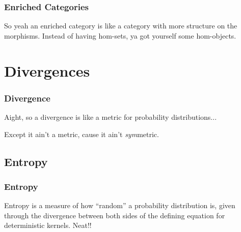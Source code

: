 \documentclass{beamer}
\begin{document}
\begin{frame}
	\frametitle{Enriched Categories}
	So yeah an enriched category is like a category with more structure on the morphisms.
	Instead of having hom-sets, ya got yourself some hom-objects.
\end{frame}

\section{Divergences}

\begin{frame}
	\frametitle{Divergence}
	Aight, so a divergence is like a metric for probability distributions...

	Except it ain't a metric, cause it ain't \emph{sym}metric.
\end{frame}

\subsection{Entropy}

\begin{frame}
	\frametitle{Entropy}
	Entropy is a measure of how ``random'' a probability distribution is, given through the divergence between both sides of the defining equation for deterministic kernels. Neat!!
\end{frame}
\end{document}
